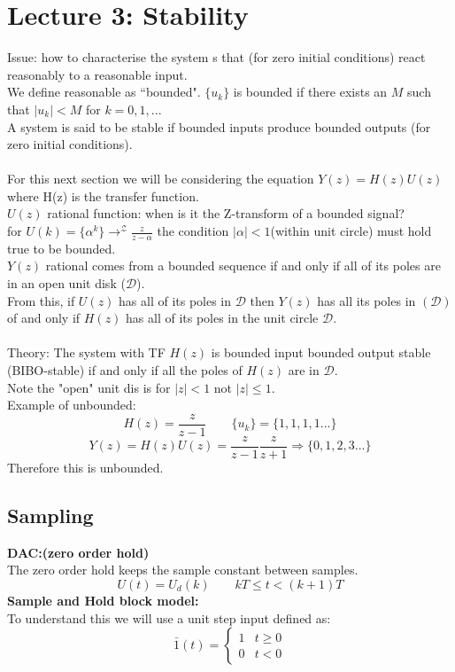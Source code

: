 \documentclass[a4paper,11pt]{article}
\begin{document}
\section{Lecture 3: Stability}
	Issue: how to characterise the system s that (for zero initial conditions) react reasonably to a reasonable input.\\
	We define reasonable as ``bounded". $\{u_k\}$ is bounded if there exists an $M$ such that $|u_k|<M $ for $k=0,1,...$\\
	A system is said to be stable if bounded inputs produce bounded outputs (for zero initial conditions).\\\\
	For this next section we will be considering the equation $Y(z)=H(z)U(z)$ where H(z) is the transfer function.\\
	$U(z)$ rational function: when is it the Z-transform of a bounded signal?\\
	for $U(k)=\{\alpha^k\} \rightarrow^\mathcal{Z} \frac{z}{z-\alpha}$ the condition $|\alpha|<1$(within unit circle) must hold true to be bounded.\\
	$Y(z)$ rational comes from a bounded sequence if and only if all of its poles are in an open unit disk ($\mathcal{D}$).\\
	From this, if $U(z)$ has all of its poles in $\mathcal{D}$ then $Y(z)$ has all its poles in $(\mathcal{D})$ of and only if $H(z)$ has all of its poles in the unit circle $\mathcal{D}$.\\\\
	Theory:
	\indent The system with TF $H(z)$ is bounded input bounded output stable (BIBO-stable) if and only if all the poles of $H(z)$ are in $\mathcal{D}$.\\
	Note the "open" unit dis is for $|z|<1$ not \sout{$|z|\leq1$}.\\
	Example of unbounded:
	\begin{equation}
		H(z) = \frac{z}{z-1} \qquad \{u_k\}=\{1,1,1,1...\}
	\end{equation}
	\begin{equation}
	    	Y(z) = H(z)U(z)=\frac{z}{z-1}\frac{z}{z+1}\Rightarrow\{0,1,2,3...\}
	\end{equation}
	Therefore this is unbounded.\\
	\subsection{Sampling}
		\textbf{DAC:(zero order hold)}\\
		The zero order hold keeps the sample constant between samples. 
		\begin{equation}
			U(t)=U_d(k)\qquad kT\leq t < (k+1)T		
		\end{equation}
		\textbf{Sample and Hold block model:}\\
		To understand this we will use a unit step input defined as:
		\[\bar{1}(t) =\begin{cases} 
      			1 & t \geq 0\\
      			0 & t < 0			
   			\end{cases}
			\]
			
\end{document}
